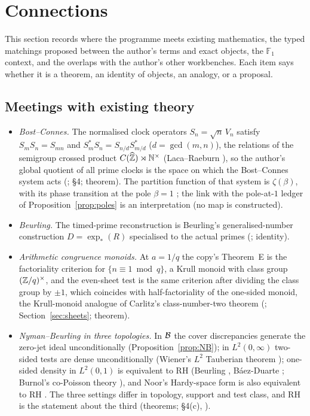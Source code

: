 \section{Connections}\label{sec:bridges}

This section records where the programme meets existing mathematics, the typed matchings proposed between the author's terms and exact objects, the $\mathbb{F}_1$ context, and the overlaps with the author's other workbenches. Each item says whether it is a theorem, an identity of objects, an analogy, or a proposal.

\subsection{Meetings with existing theory}

\begin{itemize}
\item \emph{Bost--Connes.} The normalised clock operators $S_n=\sqrt n\,V_n$ satisfy $S_mS_n=S_{mn}$ and $S_m^*S_n=S_{n/d}S_{m/d}^*$ ($d=\gcd(m,n)$), the relations of the semigroup crossed product $C(\widehat{\mathbb{Z}})\rtimes\mathbb{N}^\times$ (Laca--Raeburn \cite{LacaRaeburn}), so the author's global quotient of all prime clocks is the space on which the Bost--Connes system acts (;  §4; theorem). The partition function of that system is $\zeta(\beta)$, with its phase transition at the pole $\beta=1$ \cite{BostConnes}; the link with the pole-at-$1$ ledger of Proposition~\ref{prop:poles} is an interpretation (no map is constructed).
\item \emph{Beurling.} The timed-prime reconstruction is Beurling's generalised-number construction $D=\exp_*(R)$ specialised to the actual primes (; identity).
\item \emph{Arithmetic congruence monoids.} At $a=1/q$ the copy's Theorem~E is the factoriality criterion for $\{n\equiv1\bmod q\}$, a Krull monoid with class group $(\mathbb{Z}/q)^\times$, and the even-sheet test is the same criterion after dividing the class group by $\pm1$, which coincides with half-factoriality of the one-sided monoid, the Krull-monoid analogue of Carlitz's class-number-two theorem (\cite{BaginskiChapman,Carlitz}; Section~\ref{sec:sheets}; theorem).
\item \emph{Nyman--Beurling in three topologies.} In $\mathcal{B}$ the cover discrepancies generate the zero-jet ideal unconditionally (Proposition~\ref{prop:NB}); in $L^2(0,\infty)$ two-sided tests are dense unconditionally (Wiener's $L^2$ Tauberian theorem \cite{Wiener}); one-sided density in $L^2(0,1)$ is equivalent to RH (Beurling \cite{Beurling}, Báez-Duarte \cite{BaezDuarte}; Burnol's co-Poisson theory \cite{Burnol}), and Noor's Hardy-space form is also equivalent to RH \cite{Noor}. The three settings differ in topology, support and test class, and RH is the statement about the third (theorems;  §4(c), ).

\end{itemize}
